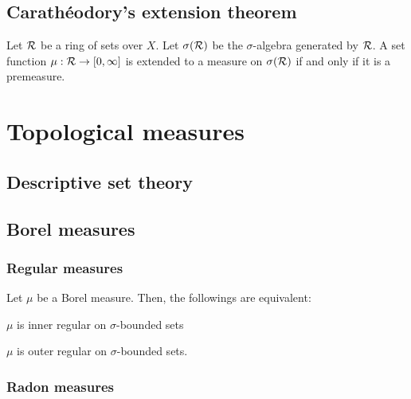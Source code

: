\documentclass{../crs}
\begin{document}
\section{Carath\'eodory's extension theorem}
\begin{thm}
Let $\mathcal{R}$ be a ring of sets over $X$.
Let $\sigma(\mathcal{R})$ be the $\sigma$-algebra generated by $\mathcal{R}$.
A set function $\mu:\cR\to[0,\oo]$ is extended to a measure on $\sigma(\mathcal{R})$ if and only if it is a premeasure.
\end{thm}



\chapter{}





\chapter{Topological measures}

\section{Descriptive set theory}





\section{Borel measures}


\subsection{Regular measures}

\begin{thm}
Let $\mu$ be a Borel measure.
Then, the followings are equivalent:
\begin{cond}
\item$\mu$ is inner regular on $\sigma$-bounded sets
\item $\mu$ is outer regular on $\sigma$-bounded sets.
\end{cond}
\end{thm}



\subsection{Radon measures}
\end{document}
